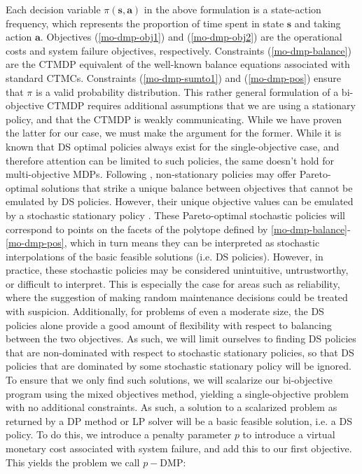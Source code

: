 \documentclass[11pt,authoryear,a4paper]{article}
\theoremstyle{definition}
\begin{document}
Each decision variable $\pi(\bm{s,a})$ in the above formulation is a state-action frequency, which represents the proportion of time spent in state $\bm{s}$ and taking action $\bm{a}$. Objectives (\ref{mo-dmp-obj1}) and (\ref{mo-dmp-obj2}) are the operational costs and system failure objectives, respectively. Constraints (\ref{mo-dmp-balance}) are the CTMDP equivalent of the well-known balance equations associated with standard CTMCs. Constraints (\ref{mo-dmp-sumto1}) and (\ref{mo-dmp-pos}) ensure that $\pi$ is a valid probability distribution. This rather general formulation of a bi-objective CTMDP requires additional assumptions that we are using a stationary policy, and that the CTMDP is weakly communicating. While we have proven the latter for our case, we must make the argument for the former. While it is known that DS optimal policies always exist for the single-objective case, and therefore attention can be limited to such policies, the same doesn't hold for multi-objective MDPs. Following \cite{WHITE1982momdpNonStationary}, non-stationary policies may offer Pareto-optimal solutions that strike a unique balance between objectives that cannot be emulated by DS policies. However, their unique objective values can be emulated by a stochastic stationary policy \citep{roijers2013momdp_survey}. These Pareto-optimal stochastic policies will correspond to points on the facets of the polytope defined by \eqref{mo-dmp-balance}-\eqref{mo-dmp-pos}, which in turn means they can be interpreted as stochastic interpolations of the basic feasible solutions (i.e. DS policies). However, in practice, these stochastic policies may be considered unintuitive, untrustworthy, or difficult to interpret. This is especially the case for areas such as reliability, where the suggestion of making random maintenance decisions could be treated with suspicion. Additionally, for problems of even a moderate size, the DS policies alone provide a good amount of flexibility with respect to balancing between the two objectives. As such, we will limit ourselves to finding DS policies that are non-dominated with respect to stochastic stationary policies, so that DS policies that are dominated by some stochastic stationary policy will be ignored. To ensure that we only find such solutions, we will scalarize our bi-objective program using the mixed objectives method, yielding a single-objective problem with no additional constraints. As such, a solution to a scalarized problem as returned by a DP method or LP solver will be a basic feasible solution, i.e. a DS policy. To do this, we introduce a penalty parameter $p$ to introduce a virtual monetary cost associated with system failure, and add this to our first objective. This yields the problem we call $p-$DMP:
\end{document}
